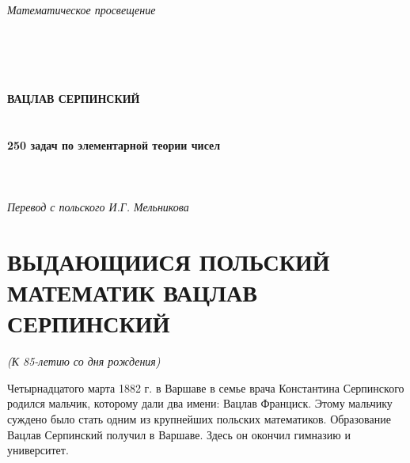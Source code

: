 \documentclass[12pt, a4paper, openany]{book}
\begin{document}
	
	\begin{titlepage}
		
		\begin{center}
			
			\vspace*{\fill}
			\begin{flushleft}
		{\large	\textit{Математическое просвещение}			}
			\end{flushleft}
			\ \\
\ \\
			\ \\
\ \\
			{\large\bf ВАЦЛАВ СЕРПИНСКИЙ\\}
			\ \\
			\ \\
			{\Huge\bf 250 задач по элементарной теории чисел\\}
			\ \\
			\ \\
			\ \\
			\textit{Перевод с польского И.Г. Мельникова}

			\vspace*{\fill}    
			
			\vfill
			

		\end{center}
		
	\end{titlepage}
	
	\thispagestyle{empty} %
	
	\newpage
	
\setcounter{secnumdepth}{0}  
	
	\section[\textit{И. Г. Мельников}. Выдающийся польский математик Вацлав Серпинский (к 85-летию со дня рождения)]{\center ВЫДАЮЩИИСЯ ПОЛЬСКИЙ МАТЕМАТИК ВАЦЛАВ СЕРПИНСКИЙ}
		\begin{center}
\textit{(К 85-летию со дня рождения)}
\end{center}
	
	Четырнадцатого марта 1882 г. в Варшаве в семье врача Константина Серпинского родился мальчик, которому дали два имени: Вацлав Франциск. Этому мальчику суждено было стать одним из крупнейших польских математиков.
	Образование Вацлав Серпинский получил в Варшаве. Здесь он окончил гимназию и университет.
\end{document}
